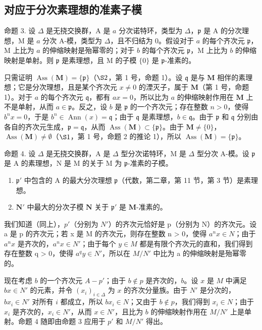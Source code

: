 \subsection{对应于分次素理想的准素子模}

命题 3. 设 \(\Delta\) 是无挠交换群，A 是 \(a\) 分次诺特环，类型为 \(\Delta\)，\(\mathfrak{p}\) 是 A 的分次理想，M 是 \(a\) 分次 A-模，类型为 \(\Delta\)，且不归结为 0。假设对于 \(a\) 的每个齐次元 \(\mathfrak{p}\)，M 上比为 \(a\) 的伸缩映射是殆幂零的；对于 \(b\) 的每个齐次元 \(\mathfrak{p}\)，M 上比为 \(b\) 的伸缩映射是单射。则 \(\mathfrak{p}\) 是素理想，且 M 的子模 \(\{0\}\) 是 \(\mathfrak{p}\)-准素的。

只需证明 \(\operatorname{Ass}(\mathbf{M}) = \{\mathfrak{p}\}\)（\(\S 2\)，第 1 号，命题 1）。设 \(\mathfrak{q}\) 是与 \(\mathbf{M}\) 相伴的素理想；它是分次理想，且是某个齐次元 \(x \neq 0\) 的湮灭子，属于 \(\mathbf{M}\)（第 1 号，命题 1）。对于 \(a\) 的每个齐次元 \(\mathfrak{q}\)，都有 \(ax = 0\)，所以比为 \(a\) 的伸缩映射作用在 \(\mathbf{M}\) 上不是单射，从而 \(a \in \mathfrak{p}\)。反之，设 \(b\) 是 \(\mathfrak{p}\) 的一个齐次元；存在整数 \(n > 0\)，使得 \(b^n x = 0\)，于是 \(b^n \in \operatorname{Ann}(x) = \mathfrak{q}\)；由于 \(\mathfrak{q}\) 是素理想，\(b \in \mathfrak{q}\)。由于 \(\mathfrak{p}\) 和 \(\mathfrak{q}\) 分别由各自的齐次元生成，\(\mathfrak{p} = \mathfrak{q}\)，从而 \(\operatorname{Ass}(\mathbf{M}) \subset \{\mathfrak{p}\}\)。由于 \(\mathbf{M} \neq \{0\}\)，\(\operatorname{Ass}(\mathbf{M}) \neq \emptyset\)（\(\S 1\)，第 1 号，命题 2 的推论 1），所以 \(\operatorname{Ass}(\mathbf{M}) = \{\mathfrak{p}\}\)。

命题 4. 设 \(\Delta\) 是无挠交换群，A 是 \(\Delta\) 型分次诺特环，M 是 \(\Delta\) 型分次 A-模。设 \(\mathfrak{p}\) 是 A 的素理想，N 是 M 的关于 M 为 \(\mathfrak{p}\)-准素的子模。

\begin{enumerate}
\def\labelenumi{(\roman{enumi})}
\item
  \(\mathfrak{p}'\) 中包含的 A 的最大分次理想 \(\mathfrak{p}\)（代数，第二章，第 11 节，第 3 节）是素理想。
\item
  \(\mathbf{N}'\) 中最大的分次子模 \(\mathbf{N}\) 关于 \(\mathfrak{p}'\) 是 \(\mathbf{M}\)-准素的。
\end{enumerate}

  我们知道（同上），\(p'\)（分别为 \(N'\)）的齐次元恰好是 p（分别为 N）的齐次元。设 a 是 p 的齐次元；若 x 是 M 的齐次元，则存在整数 n \textgreater{} 0，使得 \(a^{n}x \in N\)；由于 \(a^{n}x\) 是齐次的，\(a^{n}x \in N'\)；由于每个 \(y \in M\) 都是有限个齐次元的直和，我们得到存在整数 q \textgreater{} 0，使得 \(a^{q}y \in N'\)，所以在 \(M/N'\) 中比为 a 的伸缩映射是殆幂零的。

  现在考虑 \(b\) 的一个齐次元 \(A - p'\)；由于 \(b \notin p\) 是齐次的，\(b\)。设 \(x\) 是 \(M\) 中满足 \(bx \in N'\) 的元素，并令 \((x_i)_{i \in \Delta}\) 为 \(x\) 的齐次分量族。由于 \(N'\) 是分次的，\(bx_i \in N'\) 对所有 \(i\) 都成立，所以 \(bx_i \in N\)；又由于 \(b \notin p\)，我们得到 \(x_i \in N\)；由于 \(x_i\) 是齐次的，\(x_i \in N'\)，从而 \(x \in N'\)，且比为 \(b\) 的伸缩映射作用在 \(M/N'\) 上是单射。命题 4 随即由命题 3 应用于 \(p'\) 和 \(M/N'\) 得出。

